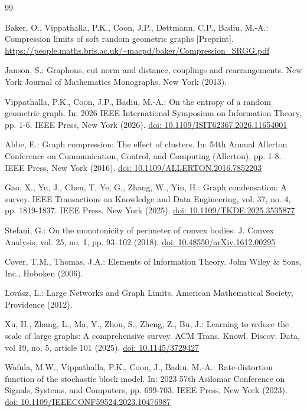 \documentclass{svproc}
\newcommand{\1}{\mathbbm{1}}
\begin{document}
%
\begin{thebibliography}{99}
%

Baker, O., Vippathalla, P.K., Coon, J.P., Dettmann, C.P., Badiu, M.-A.: Compression limits of soft random geometric graphs [Preprint]. \url{https://people.maths.bris.ac.uk/~macpd/baker/Compression_SRGG.pdf}

Janson, S.: Graphons, cut norm and distance,
couplings and rearrangements. New York Journal of Mathematics Monographs, New York (2013). %

Vippathalla, P.K., Coon, J.P., Badiu, M.-A.: On the entropy of a random geometric graph. In: 2026 IEEE International Symposium on Information Theory, pp. 1-6. IEEE Press, New York (2026). \url{doi: 10.1109/ISIT62367.2026.11654001}

Abbe, E.: Graph compression: The effect of clusters. In: 54th Annual Allerton Conference on Communication, Control, and Computing (Allerton),	 pp. 1-8. IEEE Press, New York (2016). \url{doi: 10.1109/ALLERTON.2016.7852203}

Gao, X., Yu, J., Chen, T, Ye, G., Zhang, W., Yin, H.: Graph condensation: A survey. IEEE Transactions on Knowledge and Data Engineering, vol. 37, no. 4, pp. 1819-1837. IEEE Press, New York (2025). \url{doi: 10.1109/TKDE.2025.3535877}

Stefani, G.: On the monotonicity of perimeter of convex bodies. J. Convex Analysis, vol. 25, no. 1, pp. 93–102 (2018). \url{doi: 10.48550/arXiv.1612.00295}

Cover, T.M., Thomas, J.A.: Elements of Information Theory. John Wiley \& Sons, Inc., Hoboken (2006).

Lov\'{a}sz, L.: Large Networks and Graph Limits. American Mathematical Society, Providence (2012). 

Xu, H., Zhang, L., Ma, Y., Zhou, S., Zheng, Z., Bu, J.: Learning to reduce
the scale of large graphs: A comprehensive survey. ACM Trans. Knowl. Discov. Data, vol 19, no. 5, article 101 (2025). \url{doi: 10.1145/3729427} 

Wafula, M.W., Vippathalla, P.K., Coon, J., Badiu, M.-A.: Rate-distortion function of the stochastic block model. In: 2023 57th Asilomar Conference on Signals, Systems, and Computers, pp. 699-703. IEEE Press, New York (2023). \url{doi: 10.1109/IEEECONF59524.2023.10476987}
\end{thebibliography}
\end{document}
